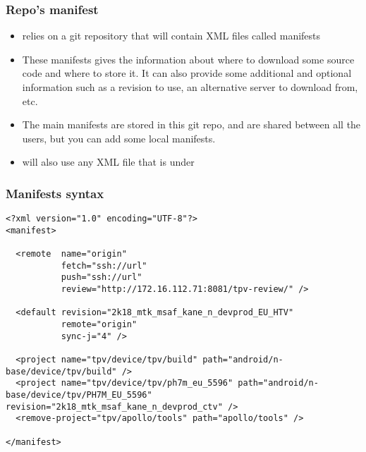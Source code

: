 \begin{frame}
  \frametitle{Repo's manifest}
  \begin{itemize}
  \item {} relies on a git repository that will contain XML
    files called manifests
  \item These manifests gives the information about where to download
    some source code and where to store it. It can also provide some
    additional and optional information such as a revision to use, an
    alternative server to download from, etc.
  \item The main manifests are stored in this git repo, and are shared
    between all the users, but you can add some local manifests.
  \item {} will also use any XML file that is under
  \end{itemize}
\end{frame}

\begin{frame}[fragile]
  \frametitle{Manifests syntax}
\begin{verbatim}
<?xml version="1.0" encoding="UTF-8"?>
<manifest>

  <remote  name="origin"
           fetch="ssh://url"
           push="ssh://url"
           review="http://172.16.112.71:8081/tpv-review/" />
		   
  <default revision="2k18_mtk_msaf_kane_n_devprod_EU_HTV"
           remote="origin"
           sync-j="4" />
		   
  <project name="tpv/device/tpv/build" path="android/n-base/device/tpv/build" />
  <project name="tpv/device/tpv/ph7m_eu_5596" path="android/n-base/device/tpv/PH7M_EU_5596" revision="2k18_mtk_msaf_kane_n_devprod_ctv" />
  <remove-project="tpv/apollo/tools" path="apollo/tools" />
  
</manifest>
\end{verbatim}
\end{frame}

